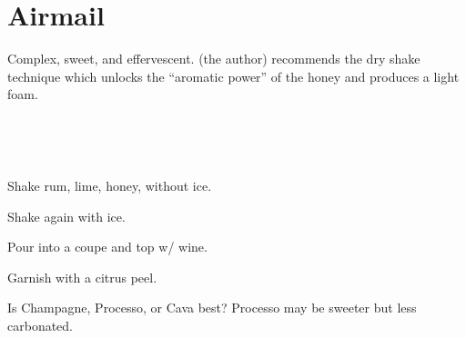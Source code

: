 \section[Airmail]{Airmail~\vegan}


\begin{recipestats}[
	servings=1,
	preptime=5~\minute,
	original=\citefield{cocktailSeminars2021}{title} \cite{cocktailSeminars2021},
]
\end{recipestats}



\begin{recipeabstract}
	Complex, sweet, and effervescent.
	\citeauthor{cocktailSeminars2021} (the author) recommends the dry shake technique which unlocks the ``aromatic power'' of the honey and produces a light foam.
\end{recipeabstract}


\begin{ingredientcolumns}
	\begin{ingredientblock}
		\\
	\end{ingredientblock}
	\begin{ingredientblock}
		\ingredient[\onehalf][\ounce]{honey}\\
		\ingredient[1\onehalf][\ounce]{sparking wine}
	\end{ingredientblock}
\end{ingredientcolumns}

\begin{preparation}
\item Shake rum, lime, honey, without ice.
\item Shake again with ice.
\item Pour into a coupe and top w/ wine.
\item Garnish with a citrus peel.
\end{preparation}


\begin{experiments}
\item Is Champagne, Processo, or Cava best?
	Processo may be sweeter but less carbonated.
\end{experiments}


\recipeend
